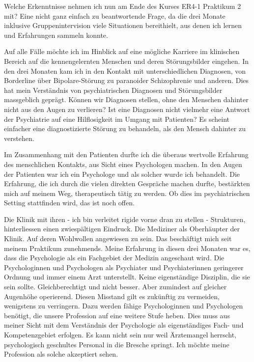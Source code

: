 Welche Erkenntnisse nehmen ich nun am Ende des Kurses ER4-1 Praktikum 2 mit? Eine nicht ganz einfach zu beantwortende Frage, da die drei Monate inklusive Gruppenintervision viele Situationen bereithielt, aus denen ich lernen und Erfahrungen sammeln konnte.

Auf alle Fälle möchte ich im Hinblick auf eine mögliche Karriere im klinischen Bereich auf die kennengelernten Menschen und deren Störungsbilder eingehen. In den drei Monaten kam ich in den Kontakt mit unterschiedlichen Diagnosen, von Borderline über Bipolare-Störung zu paranoider Schizophrenie und anderen. Dies hat mein Verständnis von psychiatrischen Diagnosen und Störungsbilder massgeblich geprägt. Können wir Diagnosen stellen, ohne den Menschen dahinter nicht aus den Augen zu verlieren? Ist eine Diagnosen nicht vielmehr eine Antwort der Psychiatrie auf eine Hilflosigkeit im Umgang mit Patienten? Es scheint einfacher eine diagnostizierte Störung  zu behandeln, als den Mensch dahinter zu verstehen.

Im Zusammenhang mit den Patienten durfte ich die überaus wertvolle Erfahrung des menschlichen Kontakts, aus Sicht eines Psychologen machen. In den Augen der Patienten war ich ein Psychologe und als solcher wurde ich behandelt. Die Erfahrung, die ich durch die vielen direkten Gespräche machen durfte, bestärkten mich auf meinem Weg, therapeutisch tätig zu werden. Ob dies im psychiatrischen Setting stattfinden wird, das ist noch offen.

Die Klinik mit ihren - ich bin verleitet \glqq rigide\grqq{} vorne dran zu stellen - Strukturen, hinterliessen einen zwiespältigen Eindruck. Die Mediziner als Oberhäupter der Klinik. Auf deren Wohlwollen angewiesen zu sein. Das beschäftigt mich seit meinem Praktikum zunehmends. Meine Erfahrung in diesen drei Monaten war es, dass die Psychologie als ein Fachgebiet der Medizin angeschaut wird. Die Psychologinnen und Psychologen als Psychiater und Psychiaterinnen geringerer Ordnung und immer einem Arzt unterstellt. Keine eigenständige Disziplin, die sie sein sollte. Gleichberechtigt und nicht besser. Aber zumindest auf gleicher Augenhöhe operierend. Diesen Misstand gilt es zukünftig zu vermeiden, wenigstens zu verringern. Dazu werden fähige Psychologinnen und Psychologen benötigt, die unsere Profession auf eine weitere Stufe heben. Dies muss aus meiner Sicht mit dem Verständnis der Psychologie als eigenständiges Fach- und Kompetenzgebiet erfolgen. Es kann nicht sein nur weil Ärztemangel herrscht, psychologisch geschultes Personal in die Bresche springt. Ich möchte meine Profession als solche akzeptiert sehen.

